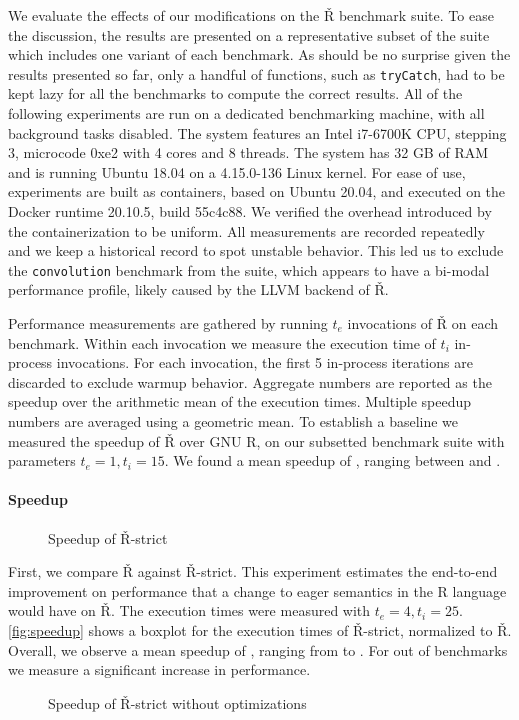 \documentclass[review,creen,acmsmall]{acmart}
\renewcommand{\Rsh}{{\sf\v R}\xspace}
\newcommand{\Rshstrict}{{\sf\v R-strict}\xspace}
\begin{document}
We evaluate the effects of our modifications on the \Rsh benchmark suite.
To ease the discussion, the results are presented on a representative subset of
the suite which includes one variant of
each benchmark. As should be no surprise given the results presented so far,
only a handful of functions, such as
\lstinline{tryCatch}, had to be kept lazy for all the benchmarks to compute
the correct results.
All of the following experiments are run on a dedicated benchmarking machine, with
all background tasks disabled. The system features an Intel i7-6700K CPU, stepping 3,
microcode 0xe2 with 4 cores and 8 threads. The system has 32 GB of RAM and is
running Ubuntu 18.04 on a 4.15.0-136 Linux kernel. For ease of use, experiments
are built as containers, based on Ubuntu 20.04, and executed on
the Docker runtime 20.10.5, build 55c4c88. We verified the overhead introduced by
the containerization to be uniform. All measurements are recorded repeatedly and we
keep a historical record to spot unstable behavior. This led us to exclude the
\lstinline{convolution} benchmark from the suite, which appears to have a
bi-modal performance profile, likely caused by the LLVM backend of \Rsh.

Performance measurements are gathered by running $t_e$ invocations of \Rsh on
each benchmark. Within each invocation we measure the execution time of $t_i$
in-process invocations. For each invocation, the first 5 in-process iterations
are discarded to exclude warmup behavior. Aggregate numbers are reported as the
speedup over the arithmetic mean of the execution times. Multiple speedup
numbers are averaged using a geometric mean. To establish a baseline we measured
the speedup of \Rsh over GNU R, on our subsetted benchmark suite with parameters
$t_e = 1, t_i = 15$. We found a mean speedup of \speedupRsh, ranging between
\speedupRshMin and \speedupRshMax.

\paragraph{Speedup}

\begin{figure}[h]
  \centering
  
  \caption{Speedup of \Rshstrict}
  \label{fig:speedup}
\end{figure}

First, we compare \Rsh against \Rshstrict. This experiment estimates the end-to-end
improvement on performance that a change to eager semantics in the R language
would have on \Rsh. The execution times were measured with $t_e = 4, t_i = 25$.
\autoref{fig:speedup} shows a boxplot for the execution times of \Rsh-strict,
normalized to \Rsh. Overall, we observe a mean speedup of
\speedupRshStrict, ranging from \speedupRshStrictMin to \speedupRshStrictMax.
For \speedupRshStrictSignificant out of \benchmarkSuiteSize benchmarks we measure a significant increase in performance.
%
\begin{figure}[h]
  \centering
  
  \caption{Speedup of \Rshstrict without optimizations}
  \label{fig:speedup-bc}
\end{figure}
%
\end{document}
